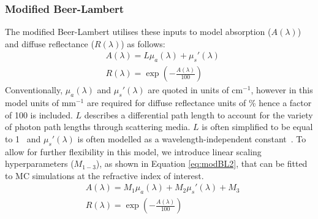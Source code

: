 \subsubsection{Modified Beer-Lambert}
The modified Beer-Lambert utilises these inputs to model absorption ($A(\lambda)$) and diffuse reflectance ($R(\lambda)$) as follows: 
\begin{equation}
\begin{aligned}
    & A(\lambda) = L\mu_a(\lambda) + \mu_s'(\lambda) \\
    & R(\lambda) = \exp{\left(-\frac{A(\lambda)}{100}\right)}
\end{aligned}
\label{eq:modBL1}
\end{equation}
Conventionally, $\mu_a(\lambda)$ and $\mu_s'(\lambda)$ are quoted in units of cm\textrm{$^{-1}$}, however in this model units of mm\textrm{$^{-1}$} are required for diffuse reflectance units of \% hence a factor of 100 is included. $L$ describes a differential path length to account for the variety of photon path lengths through scattering media. $L$ is often simplified to be equal to 1~\citep{Clancy2015} and $\mu_s'(\lambda)$ is often modelled as a wavelength-independent constant~\citep{Clancy2015, Ma2016}. 
To allow for further flexibility in this model,
we introduce linear scaling hyperparameters ($M_{1-3}$), as shown in Equation \eqref{eq:modBL2}, that can be fitted to MC simulations at the refractive index of interest. 
\begin{equation}
\begin{aligned}
    & A(\lambda) = M_1\mu_a(\lambda) + M_2\mu_s'(\lambda) + M_3 \\
    & R(\lambda) = \exp{\left(-\frac{A(\lambda)}{100}\right)}
\end{aligned}
\label{eq:modBL2}
\end{equation}

